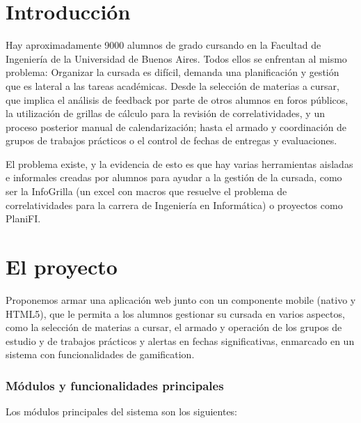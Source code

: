 \documentclass[a4paper,11pt]{article}
\begin{document}

\section*{Introducción}

\baselineskip=18pt
Hay aproximadamente 9000 alumnos de grado cursando en la Facultad de Ingeniería
de la Universidad de Buenos Aires. Todos ellos se enfrentan al mismo problema:
Organizar la cursada es difícil, demanda una planificación y gestión que es
lateral a las tareas académicas. Desde la selección de materias a cursar, que
implica el análisis de feedback por parte de otros alumnos en foros públicos,
la utilización de grillas de cálculo para la revisión de correlatividades, y un
proceso posterior manual de calendarización; hasta el armado y coordinación de
grupos de trabajos prácticos o el control de fechas de entregas y evaluaciones.

El problema existe, y la evidencia de esto es que hay varias herramientas
aisladas e informales creadas por alumnos para ayudar a la gestión de la
cursada, como ser la InfoGrilla (un excel con macros que resuelve el problema
de correlatividades para la carrera de Ingeniería en Informática) o proyectos
como PlaniFI.

\section*{{\Large{}El proyecto}}

Proponemos armar una aplicación web junto con un componente mobile (nativo y
HTML5), que le permita a los alumnos gestionar su cursada en varios aspectos,
como la selección de materias a cursar, el armado y operación de los grupos de
estudio y de trabajos prácticos y alertas en fechas significativas, enmarcado
en un sistema con funcionalidades de gamification.

\subsubsection*{\textbf{Módulos y funcionalidades principales}}

Los módulos principales del sistema son los siguientes:
\end{document}
